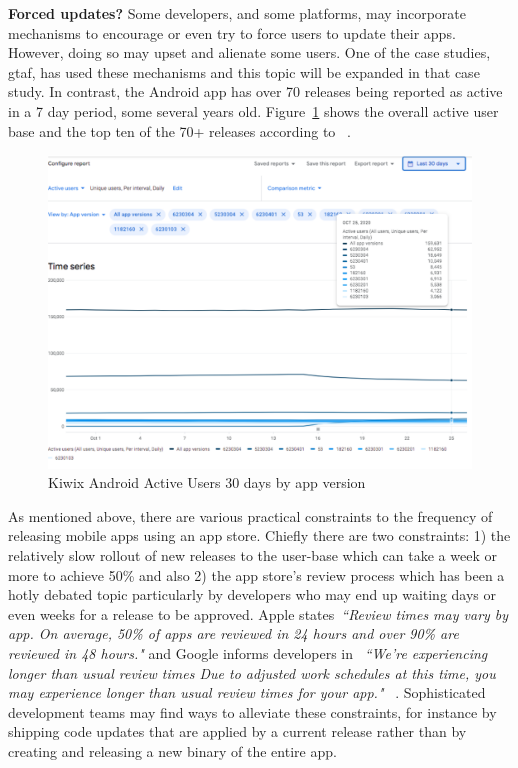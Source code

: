 \textbf{Forced updates?} Some developers, and some platforms, may incorporate mechanisms to encourage or even try to force users to update their apps. However, doing so may upset and alienate some users. One of the case studies, \Gls{gtaf}, has used these mechanisms and this topic will be expanded in that case study. In contrast, the  Android app has over 70 releases being reported as active in a 7 day period, some several years old. Figure~\ref{fig:kiwix-30d-active-users} shows the overall active user base and the top ten of the 70+ releases according to ~.

\begin{figure}
    \includegraphics[width=\linewidth]{images/android-vitals-screenshots/kiwix/kiwix-ActiveUsers-30-days-2020-10-29.pdf}
    \caption{Kiwix Android Active Users 30 days by app version}
    \label{fig:kiwix-30d-active-users}
\end{figure}

As mentioned above, there are various practical constraints to the frequency of releasing mobile apps using an app store. Chiefly there are two constraints: 1) the relatively slow rollout of new releases to the user-base which can take a week or more to achieve 50\% and also 2) the app store's review process which has been a hotly debated topic particularly by developers who may end up waiting days or even weeks for a release to be approved. Apple states~\emph{``Review times may vary by app. On average, 50\% of apps are reviewed in 24 hours and over 90\% are reviewed in 48 hours."} and Google informs developers in ~\emph{``We're experiencing longer than usual review times
Due to adjusted work schedules at this time, you may experience longer than usual review times for your app."} ~. Sophisticated development teams may find ways to alleviate these constraints, for instance by shipping code updates that are applied by a current release rather than by creating and releasing a new binary of the entire app.


